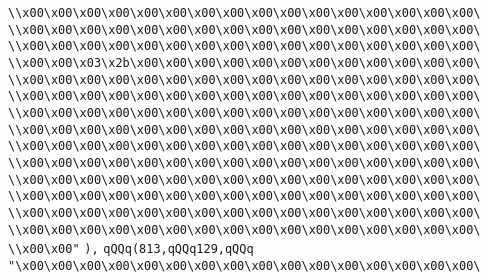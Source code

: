\verb|\\x00\x00\x00\x00\x00\x00\x00\x00\x00\x00\x00\x00\x00\x00\x00\x00\|\newline
\verb|\\x00\x00\x00\x00\x00\x00\x00\x00\x00\x00\x00\x00\x00\x00\x00\x00\|\newline
\verb|\\x00\x00\x00\x00\x00\x00\x00\x00\x00\x00\x00\x00\x00\x00\x00\x00\|\newline
\verb|\\x00\x00\x03\x2b\x00\x00\x00\x00\x00\x00\x00\x00\x00\x00\x00\x00\|\newline
\verb|\\x00\x00\x00\x00\x00\x00\x00\x00\x00\x00\x00\x00\x00\x00\x00\x00\|\newline
\verb|\\x00\x00\x00\x00\x00\x00\x00\x00\x00\x00\x00\x00\x00\x00\x00\x00\|\newline
\verb|\\x00\x00\x00\x00\x00\x00\x00\x00\x00\x00\x00\x00\x00\x00\x00\x00\|\newline
\verb|\\x00\x00\x00\x00\x00\x00\x00\x00\x00\x00\x00\x00\x00\x00\x00\x00\|\newline
\verb|\\x00\x00\x00\x00\x00\x00\x00\x00\x00\x00\x00\x00\x00\x00\x00\x00\|\newline
\verb|\\x00\x00\x00\x00\x00\x00\x00\x00\x00\x00\x00\x00\x00\x00\x00\x00\|\newline
\verb|\\x00\x00\x00\x00\x00\x00\x00\x00\x00\x00\x00\x00\x00\x00\x00\x00\|\newline
\verb|\\x00\x00\x00\x00\x00\x00\x00\x00\x00\x00\x00\x00\x00\x00\x00\x00\|\newline
\verb|\\x00\x00\x00\x00\x00\x00\x00\x00\x00\x00\x00\x00\x00\x00\x00\x00\|\newline
\verb|\\x00\x00\x00\x00\x00\x00\x00\x00\x00\x00\x00\x00\x00\x00\x00\x00\|\newline
\verb|\\x00\x00"|\newline
\verb|),|\newline
\verb|qQQq(813,qQQq129,qQQq|\newline
\verb|"\x00\x00\x00\x00\x00\x00\x00\x00\x00\x00\x00\x00\x00\x00\x00\x00\|\newline
